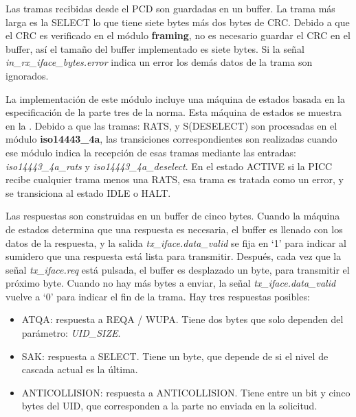 \documentclass[a4paper, twoside, 11pt]{report}
\begin{document}
Las tramas recibidas desde el PCD son guardadas en un buffer. La trama más larga es la SELECT lo que tiene siete bytes más dos bytes de CRC. Debido a que el CRC es verificado en el módulo \textbf{framing}, no es necesario guardar el CRC en el buffer, así el tamaño del buffer implementado es siete bytes. Si la señal \textit{in\_rx\_iface\_bytes.error} indica un error los demás datos de la trama son ignorados.

La implementación de este módulo incluye una máquina de estados basada en la especificación de la parte tres de la norma. Esta máquina de estados se muestra en la . Debido a que las tramas: RATS, y S(DESELECT) son procesadas en el módulo \textbf{iso14443\_4a}, las transiciones correspondientes son realizadas cuando ese módulo indica la recepción de esas tramas mediante las entradas: \textit{iso14443\_4a\_rats} y \textit{iso14443\_4a\_deselect}. En el estado ACTIVE si la PICC recibe cualquier trama menos una RATS, esa trama es tratada como un error, y se transiciona al estado IDLE o HALT.

Las respuestas son construidas en un buffer de cinco bytes. Cuando la máquina de estados determina que una respuesta es necesaria, el buffer es llenado con los datos de la respuesta,  y la salida \textit{tx\_iface.data\_valid} se fija en ‘1’ para indicar al sumidero que una respuesta está lista para transmitir. Después, cada vez que la señal \textit{tx\_iface.req} está pulsada, el buffer es desplazado un byte, para transmitir el próximo byte. Cuando no hay más bytes a enviar, la señal \textit{tx\_iface.data\_valid} vuelve a ‘0’ para indicar el fin de la trama. Hay tres respuestas posibles:

\begin{itemize}
  \item ATQA: respuesta a REQA / WUPA. Tiene dos bytes que solo dependen del parámetro: \textit{UID\_SIZE}.
  \item SAK: respuesta a SELECT. Tiene un byte, que depende de si el nivel de cascada actual es la última.
  \item ANTICOLLISION: respuesta a ANTICOLLISION. Tiene entre un bit y cinco bytes del UID, que corresponden a la parte no enviada en la solicitud.
\end{itemize}
\end{document}
